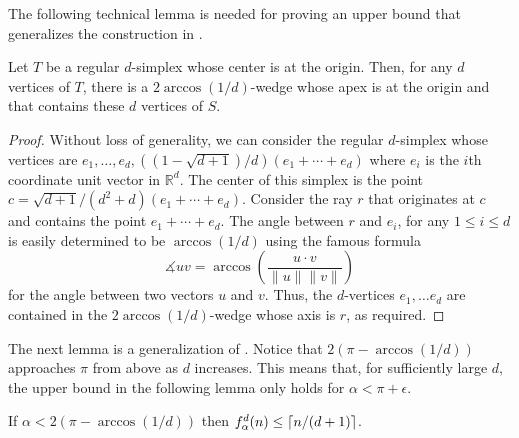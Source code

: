 \documentclass{dmtcs}
\newcommand{\R}{\mathbb{R}}
\begin{document}
The following technical lemma is needed for proving an upper bound
that generalizes the construction in .

\begin{lem}
Let $T$ be a regular $d$-simplex whose center is at the origin.  Then,
for any $d$ vertices of $T$, there is a $2\arccos(1/d)$-wedge whose
apex is at the origin and that contains these $d$ vertices of $S$.
\end{lem}

\begin{proof} 
Without loss of generality, 
we can consider the regular $d$-simplex whose vertices are
$e_1,\ldots,e_d, ((1-\sqrt{d+1})/d)(e_1+\cdots+e_d)$ where $e_i$ is the
$i$th coordinate unit vector in $\R^d$.  The center of this
simplex is the point $c=\sqrt{d+1}/(d^2+d)(e_1+\cdots+ e_d)$.
Consider the ray $r$ that originates at $c$ and
contains the point $e_1+\cdots+e_d$.  The angle between $r$ and
$e_i$, for any $1\le i\le d$ is easily determined to be
$\arccos(1/d)$ using the famous formula 
\[
   \measuredangle uv = \arccos \left(\frac{u\cdot v}{\|u\|\|v\|}\right) 
\]
for the angle between two vectors $u$ and $v$.   Thus,
the $d$-vertices $e_1,\ldots e_d$ are contained in the
$2\arccos(1/d)$-wedge whose axis is $r$, as required.
\end{proof}

The next lemma is a generalization of .  Notice that
$2(\pi-\arccos(1/d))$ approaches $\pi$ from above as $d$ increases.
This means that, for sufficiently large $d$, the upper bound in the
following lemma only holds for $\alpha < \pi+\epsilon$.

\begin{lem}
If $\alpha < 2(\pi-\arccos(1/d))$ then $f^d_\alpha(n) \le \left\lceil n/(d+1) \right\rceil$.
\end{lem}
\end{document}
